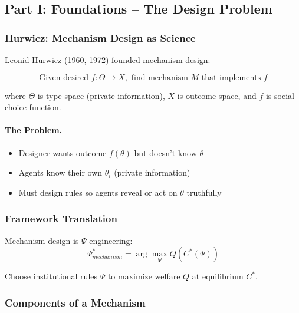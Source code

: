 \subsection{Part I: Foundations – The Design Problem}

\subsubsection{Hurwicz: Mechanism Design as Science}

Leonid Hurwicz (1960, 1972) founded mechanism design:

\begin{equation}
\boxed{
\text{Given desired } f: \Theta \to X, \text{ find mechanism } M \text{ that implements } f
}
\label{eq:hurwicz}
\end{equation}

where $\Theta$ is type space (private information), $X$ is outcome space, and 
$f$ is social choice function.

\paragraph{The Problem.}
\begin{itemize}
    \item Designer wants outcome $f(\theta)$ but doesn't know $\theta$
    \item Agents know their own $\theta_i$ (private information)
    \item Must design rules so agents reveal or act on $\theta$ truthfully
\end{itemize}

\subsubsection{Framework Translation}

Mechanism design is $\Psi$-engineering:
\begin{equation}
\boxed{
\Psi_{mechanism}^* = \arg\max_{\Psi} Q(C^*(\Psi))
}
\label{eq:psi-design}
\end{equation}

Choose institutional rules $\Psi$ to maximize welfare $Q$ at equilibrium $C^*$.

\subsubsection{Components of a Mechanism}

